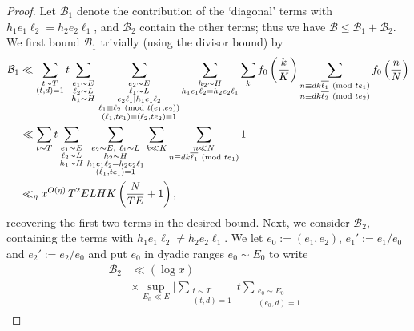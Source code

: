 \documentclass[reqno,11pt]{amsart}
\theoremstyle{definition}
\theoremstyle{remark}
\numberwithin{equation}{section}
\newcommand{\mB}{\mathcal{B}}
\renewcommand{\bar}{\overline}
\renewcommand{\pmod}[1]{\ (\textnormal{mod } #1)}
\begin{document}
\begin{proof}
Let $\mB_1$ denote the contribution of the `diagonal' terms with $h_1 e_1 \ell_2 = h_2 e_2 \ell_1$, and $\mB_2$ contain the other terms; thus we have $\mB \le \mB_1 + \mB_2$. We first bound $\mB_1$ trivially (using the divisor bound) by
\begin{equation} \label{eq:b1-estimate}
\begin{aligned}
    \mB_1 &\ll 
    \sum_{\substack{t \sim T \\ (t, d) = 1}} t 
    \sum_{\substack{e_1 \sim E \\ \ell_2 \sim L \\ h_1 \sim H}}
    \,
    \sum_{\substack{e_2 \sim E \\ \ell_1 \sim L \\ e_2\ell_1 \mid h_1e_1\ell_2 \\ \ell_1 \equiv \ell_2 \pmod{t(e_1,e_2)} \\ (\ell_1, te_1) = (\ell_2, te_2) = 1}}
    \sum_{\substack{h_2 \sim H \\ h_1e_1\ell_2 = h_2e_2\ell_1}}
    \sum_k 
    f_0\left(\frac{k}{K}\right)
    \sum_{\substack{n \equiv dk\bar{\ell_1} \pmod{te_1} \\ n \equiv dk\bar{\ell_2} \pmod{te_2}}}
    f_0\left(\frac{n}{N}\right)
    \\
    &\ll 
    \sum_{t \sim T} t 
    \sum_{\substack{e_1 \sim E \\ \ell_2 \sim L \\ h_1 \sim H}}
    \,
    \sum_{\substack{e_2 \sim E,\ \ell_1 \sim L \\ h_2 \sim H \\ h_1e_1\ell_2 = h_2e_2\ell_1  \\ (\ell_1, te_1) = 1}}
    \sum_{k \ll K} 
    \sum_{\substack{n \ll N \\ n \equiv dk\bar{\ell_1} \pmod{te_1}}}
    1
    \\
    &\ll_\eta x^{O(\eta)}\, 
    T^2 ELHK \left(\frac{N}{TE} + 1\right),
\end{aligned}
\end{equation}
recovering the first two terms in the desired bound. Next, we consider $\mB_2$, containing the terms with $h_1 e_1 \ell_2 \neq h_2 e_2 \ell_1$. We let $e_0 := (e_1, e_2)$, $e_1' := e_1/e_0$ and $e_2' := e_2/e_0$ and put $e_0$ in dyadic ranges $e_0 \sim E_0$ to write 
\[
\begin{aligned}
    \mB_2 &\ll (\log x)
    \\
    &\times \sup_{E_0 \ll E} \bigg\vert 
    \sum_{\substack{t \sim T \\ (t, d) = 1}} t \sum_{\substack{e_0 \sim E_0 \\ (e_0, d) = 1}}\, 

\end{aligned}\]
\end{proof}
\end{document}
